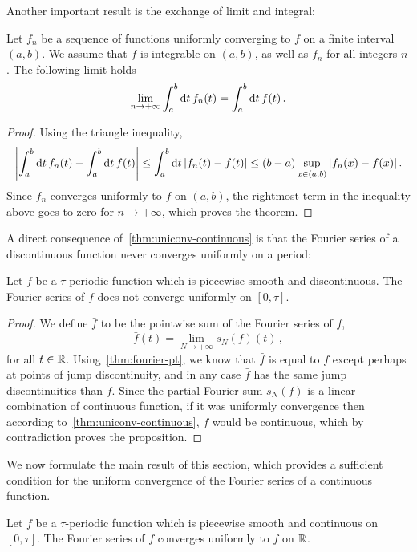 Another important result is the exchange of limit and integral:
\begin{theorem}
  Let $f_n$ be a sequence of functions uniformly converging to $f$ on a finite interval
  $(a,b)$. We assume that $f$ is integrable on $(a,b)$, as well as $f_n$ for all integers
  $n$. The following limit holds
  \begin{equation}
    \lim_{n\to+\infty}\int_a^b\mathrm{d} t\,f_n(t)=\int_a^b\mathrm{d} t\,f(t)\,.
  \end{equation}
\end{theorem}
\begin{proof}
  Using the triangle inequality,
  \begin{equation}
    \left|\int_a^b\mathrm{d} t\,f_n(t)-\int_a^b\mathrm{d} t\,f(t)\right|
    \leq\int_a^b\mathrm{d} t\,|f_n(t)-f(t)|\leq (b-a)\sup_{x\in (a,b)}|f_n(x)-f(x)|\,.
  \end{equation}
  Since $f_n$ converges uniformly to $f$ on $(a,b)$, the rightmost term in the inequality
  above goes to zero for $n\to+\infty$, which proves the theorem.
\end{proof}
A direct consequence of~\cref{thm:uniconv-continuous} is that the Fourier series of a
discontinuous function never converges uniformly on a period:
\begin{proposition}
  Let $f$ be a $\tau$-periodic function which is piecewise smooth and discontinuous. The
  Fourier series of $f$ does not converge uniformly on $[0,\tau]$.
\end{proposition}
\begin{proof}
  We define $\bar{f}$ to be the pointwise sum of the Fourier series of $f$, \ie
  \begin{equation}
    \bar{f}(t)=\lim_{N\to+\infty}s_N(f)(t)\,,
  \end{equation}
  for all $t\in\mathbb{R}$. Using~\cref{thm:fourier-pt}, we know that $\bar{f}$ is equal to $f$
  except perhaps at points of jump discontinuity, and in any case $\bar{f}$ has the same
  jump discontinuities than $f$. Since the partial Fourier sum $s_N(f)$ is a linear
  combination of continuous function, if it was uniformly convergence then according
  to~\cref{thm:uniconv-continuous}, $\bar{f}$ would be continuous, which by contradiction
  proves the proposition.
\end{proof}
We now formulate the main result of this section, which provides a sufficient condition
for the uniform convergence of the Fourier series of a continuous function.
\begin{theorem}
  \label{thm:fourier-uniconv}
  Let $f$ be a $\tau$-periodic function which is piecewise smooth and continuous on
  $[0,\tau]$. The Fourier series of $f$ converges uniformly to $f$ on $\mathbb{R}$.
\end{theorem}
